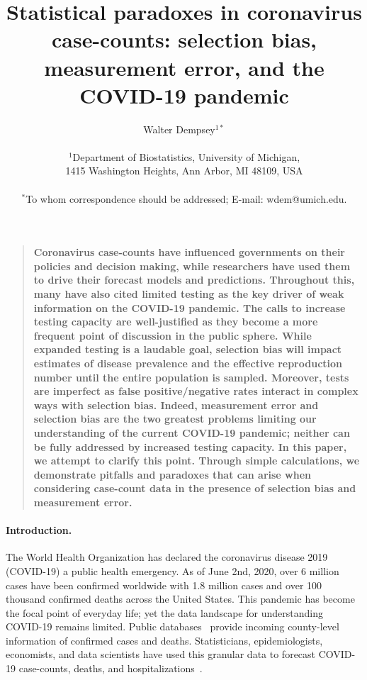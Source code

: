 \documentclass[12pt]{article}
\title{Statistical paradoxes in coronavirus case-counts: selection bias, measurement error, and the COVID-19 pandemic}
\author
{Walter Dempsey$^{1\ast}$\\
\\
\normalsize{$^{1}$Department of Biostatistics, University of Michigan,}\\
\normalsize{1415 Washington Heights, Ann Arbor, MI 48109, USA}\\
\\
\normalsize{$^\ast$To whom correspondence should be addressed; E-mail:  wdem@umich.edu.}
}
\date{}
\newenvironment{sciabstract}{%
\begin{quote} \bf}
{\end{quote}}
\begin{document}

\baselineskip24pt


\maketitle


\begin{sciabstract}
  Coronavirus case-counts have influenced governments on their policies and decision making, while researchers have used them to drive their forecast models and predictions. Throughout this, many have also cited limited testing as the key driver of weak information on the COVID-19 pandemic. The calls to increase testing capacity are well-justified as they become a more frequent point of discussion in the public sphere. While expanded testing is a laudable goal, selection bias will impact estimates of disease prevalence and the effective reproduction number until the entire population is sampled. Moreover, tests are imperfect as false positive/negative rates interact in complex ways with selection bias. Indeed, measurement error and selection bias are the two greatest problems limiting our understanding of the current COVID-19 pandemic; neither can be fully addressed by increased testing capacity. In this paper, we attempt to clarify this point. Through simple calculations, we demonstrate pitfalls and paradoxes that can arise when considering case-count data in the presence of selection bias and measurement error.
\end{sciabstract}

\paragraph*{Introduction.}

The World Health Organization has declared the coronavirus disease 2019 (COVID-19) a public health emergency.  As of June 2nd, 2020, over 6 million cases have been confirmed worldwide with 1.8 million cases and over 100 thousand confirmed deaths across the United States. This pandemic
has become the focal point of everyday life; yet the data landscape for understanding COVID-19 remains limited.  Public databases~\cite{JHU_Lancet,NYT} provide incoming county-level information of confirmed cases and deaths.  Statisticians, epidemiologists, economists, and data scientists have used this granular data to forecast COVID-19 case-counts, deaths, and hospitalizations~\cite{Giordano2020,Song2020,Ray2020,2020.IHME,Wang2020.03,JTD36385}.
\end{document}
